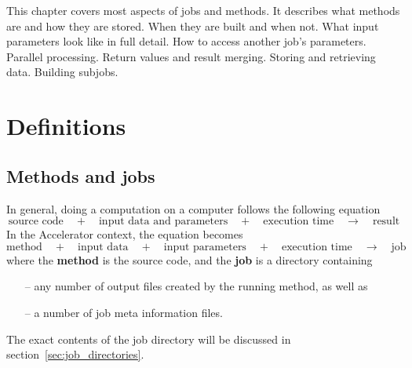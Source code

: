

This chapter covers most aspects of jobs and methods.  It describes
what methods are and how they are stored.  When they are built and
when not.  What input parameters look like in full detail.  How to
access another job's parameters.  Parallel processing.  Return values
and result merging.  Storing and retrieving data.  Building subjobs.



\section{Definitions}

\subsection{Methods and jobs}

In general, doing a computation on a computer follows the following equation
\[
  \text{source code} \quad+\quad \text{input data and parameters} \quad+\quad \text{execution time} \quad\rightarrow\quad \text{result}
\]
In the Accelerator context, the equation becomes
\[
  \text{method} \quad+\quad \text{input data} \quad+\quad \text{input parameters} \quad+\quad \text{execution time} \quad\rightarrow\quad \text{job}
\]
where the \textbf{method} is the source code, and the \textbf{job} is
a directory containing
\begin{itemize}
\item[--] any number of output files created by the running method, as well as
\item[--] a number of job meta information files.
\end{itemize}
The exact contents of the job directory will be discussed in section~\ref{sec:job_directories}.

